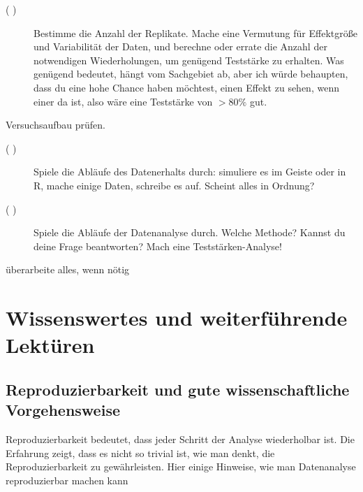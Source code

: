 \documentclass[a4paper,twoside]{tufte-book}\usepackage[]{graphicx}\usepackage[]{color}
\begin{document}
\begin{mdframed}
\begin{description}
\begin{description}
  \item[( )] Bestimme die Anzahl der Replikate. Mache eine Vermutung für Effektgröße und Variabilität der Daten, und berechne oder errate die Anzahl der notwendigen Wiederholungen, um genügend Teststärke zu erhalten. Was genügend bedeutet, hängt vom Sachgebiet ab, aber ich würde behaupten, dass du eine hohe Chance haben möchtest, einen Effekt zu sehen, wenn einer da ist, also wäre eine Teststärke von $>80\%$ gut.
  
  \end{description}
  
\item[( )] Versuchsaufbau prüfen.
  
  \begin{description}
  
  \item[( )] Spiele die Abläufe des Datenerhalts durch: simuliere es im Geiste oder in R, mache einige Daten, schreibe es auf. Scheint alles in Ordnung?
  
  \item[( )] Spiele die Abläufe der Datenanalyse durch. Welche Methode? Kannst du deine Frage beantworten? Mach eine Teststärken-Analyse!

  \end{description}


\item[( )] überarbeite alles, wenn nötig

\end{description}

\end{mdframed}


\chapter{Wissenswertes und weiterführende Lektüren}

\section{Reproduzierbarkeit und gute wissenschaftliche Vorgehensweise}

Reproduzierbarkeit bedeutet, dass jeder Schritt der Analyse wiederholbar ist. Die Erfahrung zeigt, dass es nicht so trivial ist, wie man denkt, die Reproduzierbarkeit zu gewährleisten. Hier einige Hinweise, wie man Datenanalyse reproduzierbar machen kann
\end{document}
